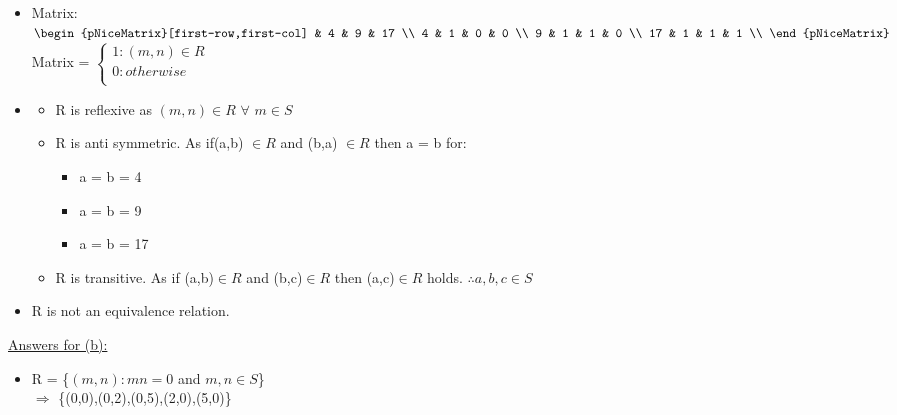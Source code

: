 \documentclass{article}
\begin{document}
\begin{enumerate}
\begin{itemize}
    \item Matrix:\\
        $\begin{pNiceMatrix}[first-row,first-col]
        & 4 & 9 & 17       \\
        4  & 1 & 0 & 0        \\ 
        9  & 1 & 1 & 0        \\
        17 & 1 & 1 & 1        \\
        \end{pNiceMatrix}$
        \hspace{1cm} Matrix = 
        $\begin{cases}
            1: (m,n)\in R\\
            0: otherwise\\  
        \end{cases}$ \\
    
    \item \begin{itemize}
       \item R is reflexive as $(m,n) \in R$ $\forall$ $m \in S$
       \item R is anti symmetric. As if(a,b) $\in R$ and (b,a) $\in R$ then a = b for: 
        \begin{itemize}
            \item[] a = b = 4 
            \item[] a = b = 9 
            \item[] a = b = 17
        \end{itemize}
        \item R is transitive. As if (a,b)$\in R$ and (b,c)$\in R$ then (a,c)$\in R$ holds. $\therefore a,b,c \in S$  
     \end{itemize}
    \item R is not an equivalence relation.
    
\end{itemize}

\pagebreak %

\underline{Answers for (b):}    

\begin{itemize}
    \item R = \{$(m,n):mn = 0$ and $m,n \in S$\}
    \\$\Rightarrow$ \{(0,0),(0,2),(0,5),(2,0),(5,0)\}\\


\end{itemize}
\end{enumerate}
\end{document}
